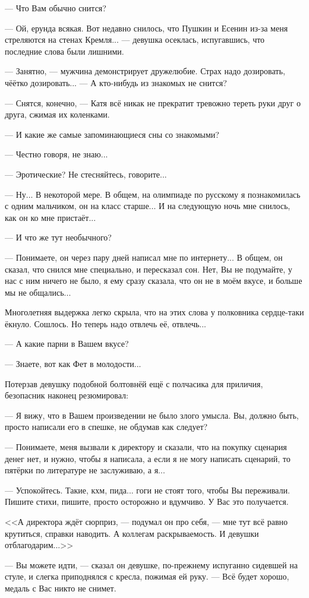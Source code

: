 --- Что Вам обычно снится?

--- Ой, ерунда всякая. Вот недавно снилось, что Пушкин и Есенин из-за меня стреляются на стенах Кремля...
--- девушка осеклась, испугавшись, что последние слова были лишними.

--- Занятно, --- мужчина демонстрирует дружелюбие. Страх надо дозировать, чёётко дозировать...
--- А кто-нибудь из знакомых не снится?

--- Снятся, конечно, --- Катя всё никак не прекратит тревожно тереть руки друг о друга, сжимая их коленками.

--- И какие же самые запоминающиеся сны со знакомыми?

--- Честно говоря, не знаю...

--- Эротические? Не стесняйтесь, говорите...

--- Ну... В некоторой мере. В общем, на олимпиаде по русскому я познакомилась с одним мальчиком, он на класс старше...
И на следующую ночь мне снилось, как он ко мне пристаёт...

--- И что же тут необычного?

--- Понимаете, он через пару дней написал мне по интернету... В общем, он сказал, что снился мне специально, и пересказал сон.
Нет, Вы не подумайте, у нас с ним ничего не было, я ему сразу сказала, что он не в моём вкусе, и больше мы не общались...

Многолетняя выдержка легко скрыла, что на этих слова у полковника сердце-таки ёкнуло. Сошлось.
Но теперь надо отвлечь её, отвлечь...

--- А какие парни в Вашем вкусе?

--- Знаете, вот как Фет в молодости...

Потерзав девушку подобной болтовнёй ещё с полчасика для приличия, безопасник наконец резюмировал:

--- Я вижу, что в Вашем произведении не было злого умысла. Вы, должно быть, просто написали его в спешке, не обдумав как следует?

--- Понимаете, меня вызвали к директору и сказали, что на покупку сценария денег нет,
и нужно, чтобы я написала, а если я не могу написать сценарий, то пятёрки по литературе не заслуживаю, а я...

--- Успокойтесь. Такие, кхм, пида... гоги не стоят того, чтобы Вы переживали.
Пишите стихи, пишите, просто осторожно и вдумчиво. У Вас это получается.

<<А директора ждёт сюрприз, --- подумал он про себя,
--- мне тут всё равно крутиться, справки наводить. А коллегам раскрываемость. И девушки отблагодарим...>>

--- Вы можете идти, --- сказал он девушке, по-прежнему испуганно сидевшей на стуле,
и слегка приподнялся с кресла, пожимая ей руку. --- Всё будет хорошо, медаль с Вас никто не снимет.

